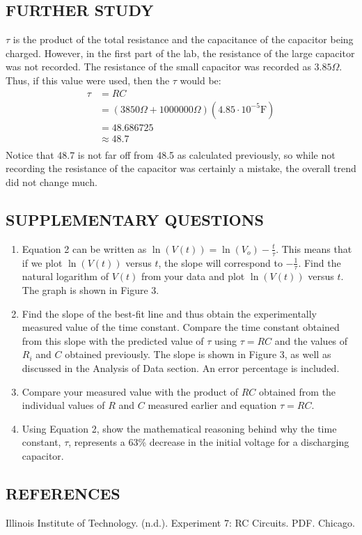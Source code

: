 \documentclass [12pt, letterpaper, twoside] {article}
\begin{document}
\subsection* {FURTHER STUDY}
\(\tau\) is the product of the total resistance and the capacitance of the capacitor being charged. However, in the first part of the lab, the resistance of the large capacitor was not recorded. The resistance of the small capacitor was recorded as \(3.85\Omega\). Thus, if this value were used, then the \(\tau\) would be:
\begin{equation*}
  \begin{split}
    \tau &= RC \\
         &= (3850 \Omega + 1000000\Omega)(4.85\cdot{10}^{-5}\text{F}) \\
         &= 48.686725 \\
         &\approx 48.7 \\
  \end{split}
\end{equation*}
Notice that 48.7 is not far off from 48.5 as calculated previously, so while not recording the resistance of the capacitor was certainly a mistake, the overall trend did not change much.

\subsection* {SUPPLEMENTARY QUESTIONS}
\begin{enumerate}
  \item{Equation 2 can be written as \(\ln(V(t)) = \ln(V_{o})-\frac{t}{\tau}\). This means that if we plot \(\ln(V(t))\) versus \(t\), the slope will correspond to \(-\frac{1}{\tau}\). Find the natural logarithm of \(V(t)\) from your data and plot \(\ln(V(t))\) versus \(t\).}
  The graph is shown in Figure 3.
  \item{Find the slope of the best-fit line and thus obtain the experimentally measured value of the time constant. Compare the time constant obtained from this slope with the predicted value of \(\tau\) using \(\tau=RC\) and the values of \(R_{i}\) and \(C\) obtained previously.}
  The slope is shown in Figure 3, as well as discussed in the Analysis of Data section. An error percentage is included.
  \item{Compare your measured value with the product of \(RC\) obtained from the individual values of \(R\) and \(C\) measured earlier and equation \(\tau=RC\).}
  \item{Using Equation 2, show the mathematical reasoning behind why the time constant, \(\tau\), represents a 63\% decrease in the initial voltage for a discharging capacitor.}
\end{enumerate}

\subsection* {REFERENCES}
Illinois Institute of Technology. (n.d.). Experiment 7: RC Circuits. PDF. Chicago.
\end{document}
